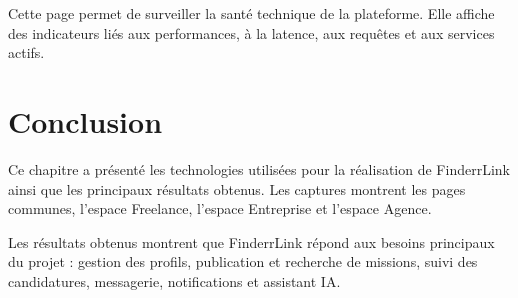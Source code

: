 Cette page permet de surveiller la santé technique de la plateforme. Elle affiche des indicateurs liés aux performances, à la latence, aux requêtes et aux services actifs.
\section{Conclusion}

Ce chapitre a présenté les technologies utilisées pour la réalisation de FinderrLink ainsi que les principaux résultats obtenus. Les captures montrent les pages communes, l'espace Freelance, l'espace Entreprise et l'espace Agence.

Les résultats obtenus montrent que FinderrLink répond aux besoins principaux du projet : gestion des profils, publication et recherche de missions, suivi des candidatures, messagerie, notifications et assistant IA.
